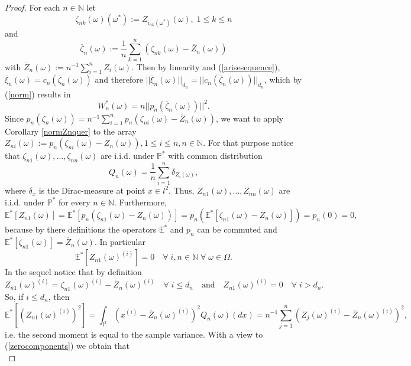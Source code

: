 \documentclass[sn-mathphys,Numbered]{sn-jnl}%
\theoremstyle{thmstyleone}%
\theoremstyle{thmstyletwo}%
\theoremstyle{thmstylethree}%
\begin{document}
\begin{proof} For each $n \in \mathbb{N}$ let $$\zeta_{nk}(\omega)(\omega^*):=Z_{i_{nk}(\omega^*)}(\omega), \; 1 \le k \le n$$ and
$$
\overline{\zeta}_n(\omega):= \frac{1}{n} \sum_{k=1}^n (\zeta_{nk}(\omega)- \overline{Z}_n(\omega))
$$
with $\overline{Z}_n(\omega):=n^{-1} \sum_{i=1}^n Z_i(\omega).$ Then by linearity and (\ref{arisesequence}), $\overline{\xi}_n(\omega) = c_n(\overline{\zeta}_n(\omega))$ and
therefore $||\overline{\xi}_n(\omega)||_{d_n}=||c_n(\overline{\zeta}_n(\omega))||_{d_n}$, which by (\ref{norm}) results in
$$
 W_n^*(\omega)=n||p_n(\overline{\zeta}_n(\omega))||^2.
$$
Since $p_n(\zeta_n(\omega))=n^{-1} \sum_{i=1}^n p_n(\zeta_{ni}(\omega)-\overline{Z}_n(\omega))$, we want to apply Corollary \ref{normZnquer} to
the array $Z_{ni}(\omega):= p_n(\zeta_{ni}(\omega)-\overline{Z}_n(\omega)), 1 \le i \le n, n \in \mathbb{N}.$ For that purpose notice that
$\zeta_{n1}(\omega),\ldots,\zeta_{nn}(\omega)$ are i.i.d. under $\mathbb{P}^*$ with common distribution
$$
 Q_n(\omega)=\frac{1}{n} \sum_{i=1}^n \delta_{Z_i(\omega)},
$$
where $\delta_x$ is the Dirac-measure at point $x \in l^2.$ Thus, $Z_{n1}(\omega),\ldots,Z_{nn}(\omega)$ are i.i.d. under $\mathbb{P}^*$ for every $n \in \mathbb{N}.$ Furthermore,
$$
 \mathbb{E}^*[Z_{n1}(\omega)]=\mathbb{E}^*[p_n(\zeta_{n1}(\omega)-\overline{Z}_n(\omega))]
 =p_n(\mathbb{E}^*[\zeta_{n1}(\omega)-\overline{Z}_n(\omega)])=p_n(0)=0,
$$
because by there definitions the operators $\mathbb{E}^*$ and $p_n$ can be commuted and $\mathbb{E}^*[\zeta_{n1}(\omega)]= \overline{Z}_n(\omega).$
In particular
\begin{equation} \label{Zn1arecentered}
\mathbb{E}^*[Z_{n1}(\omega)^{(i)}] = 0 \quad \forall \; i,n \in \mathbb{N} \; \forall \; \omega \in \Omega.
\end{equation}
In the sequel notice that by definition
\begin{equation} \label{zerocomponents}
   Z_{n1}(\omega)^{(i)} = \zeta_{n1}(\omega)^{(i)}-\overline{Z}_n(\omega)^{(i)} \quad \forall \; i \le d_n \quad \text{and} \quad                           Z_{n1}(\omega)^{(i)} =0 \quad \forall \; i >d_n.
\end{equation}
So, if $i \le d_n$, then
$$
 \mathbb{E}^*[(Z_{n1}(\omega)^{(i)})^2]=\int_{l^2} (x^{(i)}-\overline{Z}_n(\omega)^{(i)})^2 Q_n(\omega)(dx)= n^{-1} \sum_{j=1 }^n (Z_j(\omega)^{(i)}-\overline{Z}_n(\omega)^{(i)})^2,
$$
i.e. the second moment is equal to the sample variance. With a view to (\ref{zerocomponents}) we obtain that
\begin{equation} \label{Zn1secondmoments}

\end{equation}
\end{proof}
\end{document}
